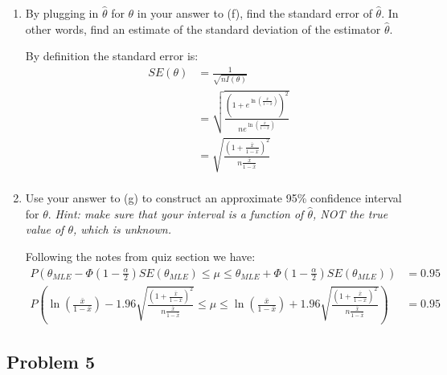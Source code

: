 \documentclass{article}
\newcommand{\1}{\mathbf{1}}
\begin{document}
\begin{enumerate}
    \newpage
    \item By plugging in $\hat{\theta}$ for $\theta$ in your answer to (f), find the standard error of $\hat{\theta}$. In other words, find an estimate of the standard deviation of the estimator $\hat{\theta}$.
    
    By definition the standard error is:
    \begin{align*}
        SE(\theta) &= \frac{1}{\sqrt{nI(\theta)}} \\
        &= \sqrt{\frac{(1+e^{ \ln{\left( \frac{\bar x}{1 - \bar x} \right)  }})^2}{ne^{ \ln{\left( \frac{\bar x}{1 - \bar x} \right)  }}}} \\
        &= \sqrt{\frac{(1 + \frac{\bar x}{1 - \bar x} )^2}{n\frac{\bar x}{1 - \bar x} }} \\
    \end{align*}
    
    \item Use your answer to (g) to construct an approximate 95\% confidence interval for $\theta$. {\it Hint: make sure that your interval is a function of $\hat{\theta}$, NOT the true value of $\theta$, which is unknown.}
    
    Following the notes from quiz section we have: 
        \begin{align*}
        P\left(\theta_{MLE} - \Phi\left(1-\frac{\alpha}{2}\right)SE(\theta_{MLE}) \leq \mu \leq \theta_{MLE} + \Phi\left(1-\frac{\alpha}{2}\right)SE(\theta_{MLE})\right) &= 0.95 \\
        P\left(  \ln{\left( \frac{\bar x}{1 - \bar x} \right)  }   - 1.96\sqrt{\frac{(1 + \frac{\bar x}{1 - \bar x} )^2}{n\frac{\bar x}{1 - \bar x} }}  \leq \mu \leq  \ln{\left( \frac{\bar x}{1 - \bar x} \right)  }  + 1.96\sqrt{\frac{(1 + \frac{\bar x}{1 - \bar x} )^2}{n\frac{\bar x}{1 - \bar x} }} \right) &= 0.95
    \end{align*} 
\end{enumerate}


\newpage
\subsection*{Problem 5}
\end{document}
